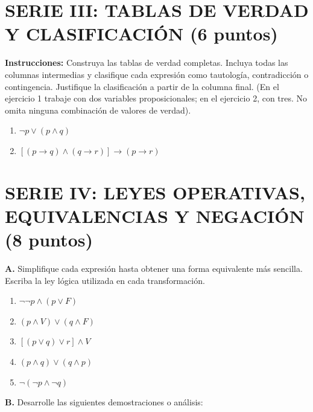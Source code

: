 \documentclass[11pt, letterpaper]{article}
\begin{document}
\vspace{0.3cm}

\section*{\color{AzulMontano} SERIE III: TABLAS DE VERDAD Y CLASIFICACIÓN (6 puntos)}
\noindent \textbf{Instrucciones:} Construya las tablas de verdad completas. Incluya todas las columnas intermedias y clasifique cada expresión como tautología, contradicción o contingencia. Justifique la clasificación a partir de la columna final. (En el ejercicio 1 trabaje con dos variables proposicionales; en el ejercicio 2, con tres. No omita ninguna combinación de valores de verdad).

\begin{enumerate}[label=\textbf{\arabic*.}, itemsep=0.35cm]
    \item $\neg p \lor (p \land q)$
    \item $[(p \rightarrow q) \land (q \rightarrow r)] \rightarrow (p \rightarrow r)$
\end{enumerate}

\vspace{0.3cm}

\section*{\color{AzulMontano} SERIE IV: LEYES OPERATIVAS, EQUIVALENCIAS Y NEGACIÓN (8 puntos)}
\noindent \textbf{A.} Simplifique cada expresión hasta obtener una forma equivalente más sencilla. Escriba la ley lógica utilizada en cada transformación.

\begin{enumerate}[label=\textbf{\arabic*.}, itemsep=0.25cm]
    \item $\neg\neg p \land (p \lor F)$
    \item $(p \land V) \lor (q \land F)$
    \item $[(p \lor q) \lor r] \land V$
    \item $(p \land q) \lor (q \land p)$
    \item $\neg(\neg p \land \neg q)$
\end{enumerate}

\vspace{0.2cm}
\noindent \textbf{B.} Desarrolle las siguientes demostraciones o análisis:
\end{document}
